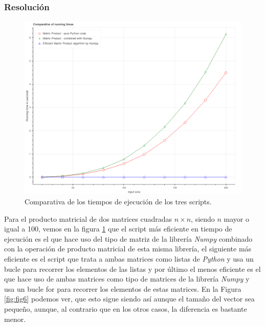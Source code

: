 \documentclass[12pt,twoside]{article}
\begin{document}
\subsubsection{Resolución}

\begin{figure}[hbt]
\begin{center}
	\includegraphics[width=1\textwidth]{41.png}
	\caption{Comparativa de los tiempos de ejecución de los tres scripts.}
	\label{fig:fig5}
\end{center}
\end{figure}

Para el producto matricial de dos matrices cuadradas $n \times n$, siendo $n$ mayor o igual a 100, vemos en la figura \ref{fig:fig5} que el script más eficiente en tiempo de ejecución es el que hace uso del tipo de matriz de la librería \textit{Numpy} combinado con la operación de producto matricial de esta misma librería, el siguiente más eficiente es el script que trata a ambas matrices como listas de \textit{Python} y usa un bucle para recorrer los elementos de las listas y por último el menos eficiente es el que hace uso de ambas matrices como tipo de matrices de la librería \textit{Numpy} y usa un bucle for para recorrer los elementos de estas matrices. En la Figura \ref{fig:fig6} podemos ver, que esto sigue siendo así aunque el tamaño del vector sea pequeño, aunque, al contrario que en los otros casos, la diferencia es bastante menor.
\end{document}
